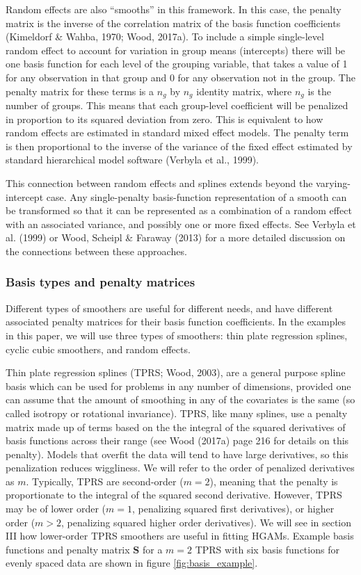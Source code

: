 \documentclass[12pt]{article}
\begin{document}
Random effects are also ``smooths'' in this framework. In this case, the
penalty matrix is the inverse of the correlation matrix of the basis
function coefficients (Kimeldorf \& Wahba, 1970; Wood, 2017a). To
include a simple single-level random effect to account for variation in
group means (intercepts) there will be one basis function for each level
of the grouping variable, that takes a value of 1 for any observation in
that group and 0 for any observation not in the group. The penalty
matrix for these terms is a \(n_g\) by \(n_g\) identity matrix, where
\(n_g\) is the number of groups. This means that each group-level
coefficient will be penalized in proportion to its squared deviation
from zero. This is equivalent to how random effects are estimated in
standard mixed effect models. The penalty term is then proportional to
the inverse of the variance of the fixed effect estimated by standard
hierarchical model software (Verbyla et al., 1999).

This connection between random effects and splines extends beyond the
varying-intercept case. Any single-penalty basis-function representation
of a smooth can be transformed so that it can be represented as a
combination of a random effect with an associated variance, and possibly
one or more fixed effects. See Verbyla et al. (1999) or Wood, Scheipl \&
Faraway (2013) for a more detailed discussion on the connections between
these approaches.

\subsubsection{Basis types and penalty
matrices}\label{basis-types-and-penalty-matrices}

Different types of smoothers are useful for different needs, and have
different associated penalty matrices for their basis function
coefficients. In the examples in this paper, we will use three types of
smoothers: thin plate regression splines, cyclic cubic smoothers, and
random effects.

Thin plate regression splines (TPRS; Wood, 2003), are a general purpose
spline basis which can be used for problems in any number of dimensions,
provided one can assume that the amount of smoothing in any of the
covariates is the same (so called isotropy or rotational invariance).
TPRS, like many splines, use a penalty matrix made up of terms based on
the the integral of the squared derivatives of basis functions across
their range (see Wood (2017a) page 216 for details on this penalty).
Models that overfit the data will tend to have large derivatives, so
this penalization reduces wiggliness. We will refer to the order of
penalized derivatives as \(m\). Typically, TPRS are second-order
(\(m=2\)), meaning that the penalty is proportionate to the integral of
the squared second derivative. However, TPRS may be of lower order
(\(m=1\), penalizing squared first derivatives), or higher order
(\(m > 2\), penalizing squared higher order derivatives). We will see in
section III how lower-order TPRS smoothers are useful in fitting HGAMs.
Example basis functions and penalty matrix \(\mathbf{S}\) for a \(m=2\)
TPRS with six basis functions for evenly spaced data are shown in figure
\ref{fig:basis_example}.
\end{document}
